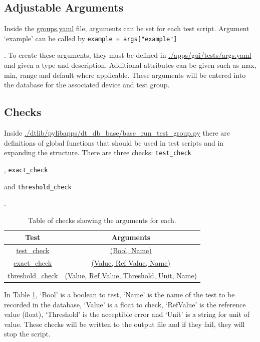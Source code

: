 \documentclass[a4paper,12pt, notitlepage]{article}
\begin{document}
\subsection{Adjustable Arguments}
\label{ssec: globalsArgs}

Inside the \url{groups.yaml} file, arguments can be set for each test script. Argument `example' can be called by \lstinline{example = args["example"]}{. To create these arguments, they must be defined in \url{./apps/gui/tests/args.yaml} and given a type and description. Additional attributes can be given such as max, min, range and default where applicable. These arguments will be entered into the database for the associated device and test group. 

\subsection{Checks}
\label{ssec: globalsChecks}

Inside \url{./dtlib/pylibapps/dt_db_base/base_run_test_group.py} there are definitions of global functions that should be used in test scripts and in expanding the structure. There are three checks: \lstinline{test_check}{, \lstinline{exact_check}{ and \lstinline{threshold_check}{.

\begin{table}[h]
	\centering
	\begin{tabular}{ c c }
		\hline 
		Test & Arguments \\ %
		\hline 
		\url{test_check} & \url{(Bool, Name)} \\ %
		\url{exact_check}  & \url{(Value, Ref Value, Name)} \\ %
		\url{threshold_check} & \url{(Value, Ref Value, Threshold, Unit, Name)} \\ %
		\hline 
	\end{tabular}
	\caption{Table of checks showing the arguments for each.}
	\label{tab: checks}
\end{table}

In Table \ref{tab: checks}, `Bool' is a boolean to test, `Name' is the name of the test to be recorded in the database, `Value' is a float to check, `RefValue' is the reference value (float), `Threshold' is the acceptible error and `Unit' is a string for unit of value. These checks will be written to the output file and if they fail, they will stop the script.

}}}}
\end{document}
